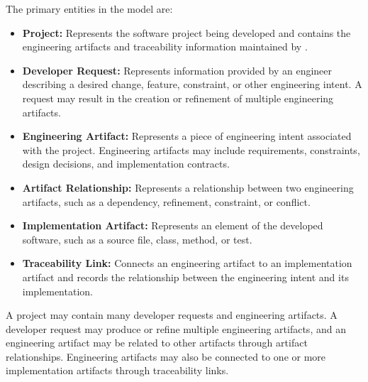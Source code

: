 \documentclass[12pt]{article}
\begin{document}
The primary entities in the model are:

\begin{itemize}
    \item \textbf{Project:} Represents the software project being developed and
    contains the engineering artifacts and traceability information maintained by
    \progname{}.

    \item \textbf{Developer Request:} Represents information provided by an
    engineer describing a desired change, feature, constraint, or other engineering
    intent. A request may result in the creation or refinement of multiple
    engineering artifacts.

    \item \textbf{Engineering Artifact:} Represents a piece of engineering intent
    associated with the project. Engineering artifacts may include requirements,
    constraints, design decisions, and implementation contracts.

    \item \textbf{Artifact Relationship:} Represents a relationship between two
    engineering artifacts, such as a dependency, refinement, constraint, or
    conflict.

    \item \textbf{Implementation Artifact:} Represents an element of the developed
    software, such as a source file, class, method, or test.

    \item \textbf{Traceability Link:} Connects an engineering artifact to an
    implementation artifact and records the relationship between the engineering
    intent and its implementation.
\end{itemize}

A project may contain many developer requests and engineering artifacts. A
developer request may produce or refine multiple engineering artifacts, and an
engineering artifact may be related to other artifacts through artifact
relationships. Engineering artifacts may also be connected to one or more
implementation artifacts through traceability links.
\end{document}
